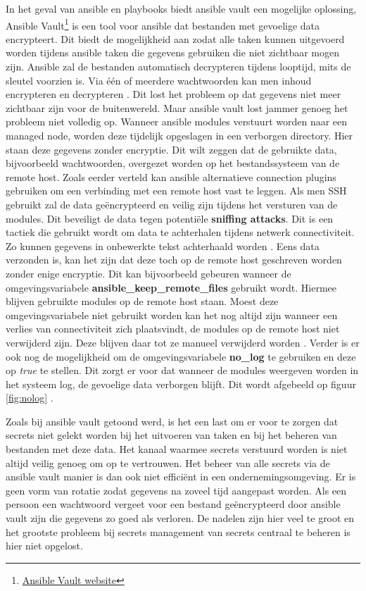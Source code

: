 In het geval van ansible en playbooks biedt ansible vault een mogelijke oplossing, Ansible Vault\footnote{\href{https://docs.ansible.com/ansible/2.9/user\_guide/vault.html}{Ansible Vault website}} is een tool voor ansible dat bestanden met gevoelige data encrypteert. Dit biedt de mogelijkheid aan zodat alle taken kunnen uitgevoerd worden tijdens ansible taken die gegevens gebruiken die niet zichtbaar mogen zijn. Ansible zal de bestanden automatisch decrypteren tijdens looptijd, mits de sleutel voorzien is. Via één of meerdere wachtwoorden kan men inhoud encrypteren en decrypteren \autocite{RedhatAnsibleVault}. Dit lost het probleem op dat gegevens niet meer zichtbaar zijn voor de buitenwereld. Maar ansible vault lost jammer genoeg het probleem niet volledig op. Wanneer ansible modules verstuurt worden naar een managed node, worden deze tijdelijk opgeslagen in een verborgen directory. Hier staan deze gegevens zonder encryptie. Dit wilt zeggen dat de gebruikte data, bijvoorbeeld wachtwoorden, overgezet worden op het bestandssysteem van de remote host. Zoals eerder verteld kan ansible alternatieve connection plugins gebruiken om een verbinding met een remote host vast te leggen. Als men SSH gebruikt zal de data geëncrypteerd en veilig zijn tijdens het versturen van de modules. Dit beveiligt de data tegen potentiële \textbf{sniffing attacks}. Dit is een tactiek die gebruikt wordt om data te achterhalen tijdens netwerk connectiviteit. Zo kunnen gegevens in onbewerkte tekst achterhaald worden \autocite{Passi2018}. Eens data verzonden is, kan het zijn dat deze toch op de remote host geschreven worden zonder enige encryptie. Dit kan bijvoorbeeld gebeuren wanneer de omgevingsvariabele \textbf{ansible\_keep\_remote\_files} gebruikt wordt. Hiermee blijven gebruikte modules op de remote host staan. Moest deze omgevingsvariabele niet gebruikt worden kan het nog altijd zijn wanneer een verlies van connectiviteit zich plaatsvindt, de modules op de remote host niet verwijderd zijn. Deze blijven daar tot ze manueel verwijderd worden \autocite{GB2018}. Verder is er ook nog de mogelijkheid om de omgevingsvariabele \textbf{no\_log} te gebruiken en deze op \textit{true} te stellen. Dit zorgt er voor dat wanneer de modules weergeven worden in het systeem log, de gevoelige data verborgen blijft. Dit wordt afgebeeld op figuur \ref{fig:nolog} \autocite{GB2018}.
\newpage

Zoals bij ansible vault getoond werd, is het een last om er voor te zorgen dat secrets niet gelekt worden bij het uitvoeren van taken en bij het beheren van bestanden met deze data. Het kanaal waarmee secrets verstuurd worden is niet altijd veilig genoeg om op te vertrouwen. Het beheer van alle secrets via de ansible vault manier is dan ook niet efficiënt in een ondernemingsomgeving. Er is geen vorm van rotatie zodat gegevens na zoveel tijd aangepast worden. Als een persoon een wachtwoord vergeet voor een bestand geëncrypteerd door ansible vault zijn die gegevens zo goed als verloren. De nadelen zijn hier veel te groot en het grootste probleem bij secrets management van secrets centraal te beheren is hier niet opgelost. 

